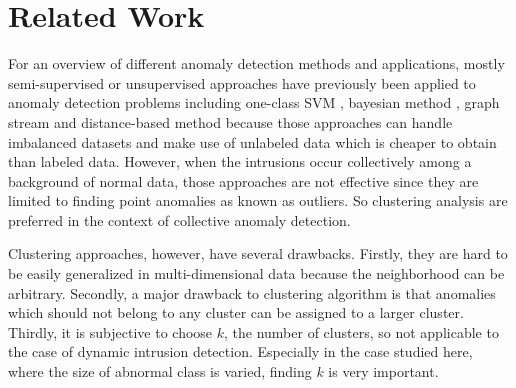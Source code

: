 \section{Related Work}
\label{sec:relatedwork}
For an overview of different anomaly detection methods and applications, mostly semi-supervised or unsupervised approaches have previously been applied to anomaly detection problems including one-class SVM \cite{ester96}, bayesian method \cite{holst12}, graph stream \cite{aggarwal01} and distance-based method \cite{ramaswamy00} because those approaches can handle imbalanced datasets and make use of unlabeled data which is cheaper to obtain than labeled data. 
However, when the intrusions occur collectively among a background of normal data, those approaches are not effective since they are limited to finding point anomalies as known as outliers. 
So clustering analysis \cite{breuning00} \cite{knorr00} are preferred in the context of collective anomaly detection. 

Clustering approaches, however, have several drawbacks. 
Firstly, they are hard to be easily generalized in multi-dimensional data because the neighborhood can be arbitrary. 
Secondly, a major drawback to clustering algorithm is that anomalies which should not belong to any cluster can be assigned to a larger cluster. 
Thirdly, it is subjective to choose $k$, the number of clusters, so not applicable to the case of dynamic intrusion detection. 
Especially in the case studied here, where the size of abnormal class is varied, finding $k$ is very important. 

